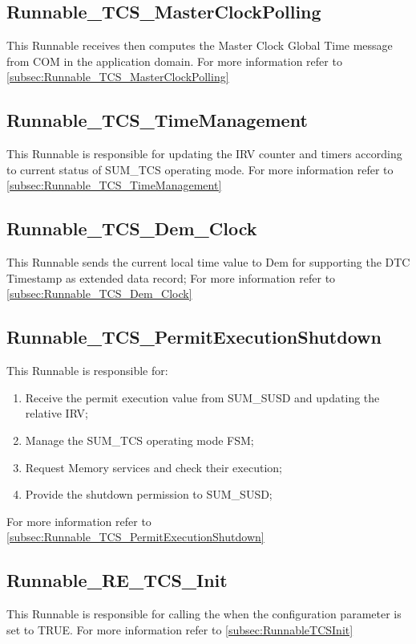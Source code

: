 \subsection{Runnable_TCS_MasterClockPolling}
This Runnable receives then computes the Master Clock Global Time message from COM in the application domain.
For more information refer to \ref{subsec:Runnable_TCS_MasterClockPolling}

\subsection{Runnable_TCS_TimeManagement}
This Runnable is responsible for updating the IRV counter and timers according to current status of SUM\_TCS operating mode.
For more information refer to \ref{subsec:Runnable_TCS_TimeManagement}

\subsection{Runnable_TCS_Dem_Clock}
This Runnable sends the current local time value to Dem for supporting the DTC Timestamp as extended data record;
For more information refer to \ref{subsec:Runnable_TCS_Dem_Clock}

\subsection{Runnable_TCS_PermitExecutionShutdown}
This Runnable is responsible for:
\begin{enumerate}
	\item Receive the permit execution value from SUM\_SUSD and updating the relative IRV;
	\item Manage the SUM\_TCS operating mode FSM;
	\item Request Memory services and check their execution;
	\item Provide the shutdown permission to SUM\_SUSD;
\end{enumerate}
For more information refer to \ref{subsec:Runnable_TCS_PermitExecutionShutdown}

\subsection{Runnable_RE_TCS_Init}
This Runnable is responsible for calling the  when the configuration parameter  is set to TRUE.
For more information refer to \ref{subsec:RunnableTCSInit}

